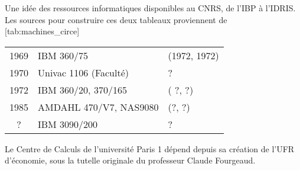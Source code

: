 \begin{table}[!htb]
\begin{sidecaption}{Une idée des ressources informatiques disponibles au CNRS, de l'IBP à l'IDRIS. Les sources pour construire ces deux tableaux proviennent de \autocites{CNRS1972, Boucher2000, Mounier2010}}[tab:machines_circe]
\begin{minipage}{1\textwidth}
{{\begin{tabular}{@{}cll@{}}
				1969     & IBM 360/75               & (1972, 1972)   \\
				1970     & Univac 1106 (Faculté)    & ?              \\
				1972     & IBM 360/20, 370/165      & ( ?, ?)        \\
				1985     & AMDAHL 470/V7, NAS9080   & (?, ?)         \\
				?        & IBM 3090/200             & ?              \\ \bottomrule
				\end{tabular}%
				}
			}
		\end{minipage}
  \end{sidecaption}
\end{table}







Le Centre de Calculs de l'université Paris 1 dépend depuis sa création de l'UFR d'économie, sous la tutelle originale du professeur Claude Fourgeaud.

